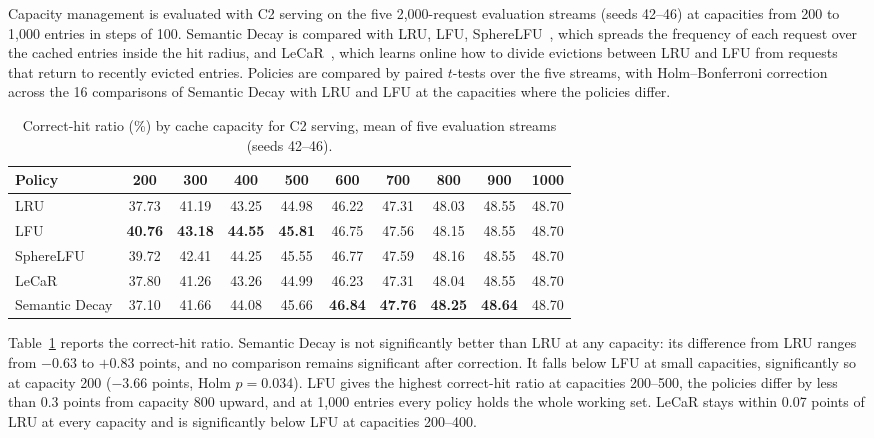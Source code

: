 \documentclass[authoryear,preprint,review,12pt]{elsarticle}
\begin{document}
Capacity management is evaluated with C2 serving on the five 2,000-request evaluation streams (seeds 42--46) at capacities from 200 to 1,000 entries in steps of 100. Semantic Decay is compared with LRU, LFU, SphereLFU~\citep{biton2026spherelfu}, which spreads the frequency of each request over the cached entries inside the hit radius, and LeCaR~\citep{vietri2018lecar}, which learns online how to divide evictions between LRU and LFU from requests that return to recently evicted entries. Policies are compared by paired $t$-tests over the five streams, with Holm--Bonferroni correction across the 16 comparisons of Semantic Decay with LRU and LFU at the capacities where the policies differ.

\begin{table}[htbp]
\centering
\caption{Correct-hit ratio (\%) by cache capacity for C2 serving, mean of five evaluation streams (seeds 42--46).}
\label{tab:eviction_capacity}
\footnotesize
\setlength{\tabcolsep}{4pt}
\begin{tabular}{lccccccccc}
\toprule
Policy & 200 & 300 & 400 & 500 & 600 & 700 & 800 & 900 & 1000 \\
\midrule
LRU & 37.73 & 41.19 & 43.25 & 44.98 & 46.22 & 47.31 & 48.03 & 48.55 & 48.70 \\
LFU & \textbf{40.76} & \textbf{43.18} & \textbf{44.55} & \textbf{45.81} & 46.75 & 47.56 & 48.15 & 48.55 & 48.70 \\
SphereLFU & 39.72 & 42.41 & 44.25 & 45.55 & 46.77 & 47.59 & 48.16 & 48.55 & 48.70 \\
LeCaR & 37.80 & 41.26 & 43.26 & 44.99 & 46.23 & 47.31 & 48.04 & 48.55 & 48.70 \\
Semantic Decay & 37.10 & 41.66 & 44.08 & 45.66 & \textbf{46.84} & \textbf{47.76} & \textbf{48.25} & \textbf{48.64} & 48.70 \\
\bottomrule
\end{tabular}
\end{table}

Table~\ref{tab:eviction_capacity} reports the correct-hit ratio. Semantic Decay is not significantly better than LRU at any capacity: its difference from LRU ranges from $-0.63$ to $+0.83$ points, and no comparison remains significant after correction. It falls below LFU at small capacities, significantly so at capacity 200 ($-3.66$ points, Holm $p=0.034$). LFU gives the highest correct-hit ratio at capacities 200--500, the policies differ by less than 0.3 points from capacity 800 upward, and at 1,000 entries every policy holds the whole working set. LeCaR stays within 0.07 points of LRU at every capacity and is significantly below LFU at capacities 200--400.
\end{document}
